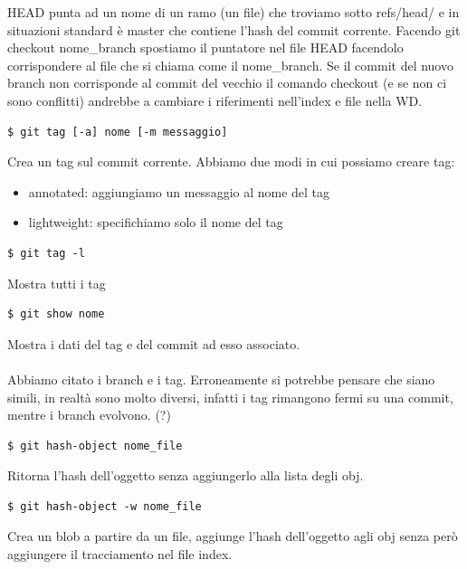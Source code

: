 \noindent HEAD punta ad un nome di un ramo (un file) che troviamo sotto refs/head/ e in situazioni standard è master che contiene l'hash del commit corrente. Facendo git checkout nome\_branch spostiamo il puntatore nel file HEAD facendolo corrispondere al file che si chiama come il nome\_branch.
Se il commit del nuovo branch non corrisponde al commit del vecchio il comando checkout (e se non ci sono conflitti) andrebbe a cambiare i riferimenti nell'index e file nella WD.

\begin{verbatim}
$ git tag [-a] nome [-m messaggio]
\end{verbatim}
Crea un tag sul commit corrente. Abbiamo due modi in cui possiamo creare tag:
\begin{itemize}
    \item annotated: aggiungiamo un messaggio al nome del tag 
    \item lightweight: specifichiamo solo il nome del tag
\end{itemize}

\begin{verbatim}
$ git tag -l
\end{verbatim}
Mostra tutti i tag

\begin{verbatim}
$ git show nome
\end{verbatim}
Mostra i dati del tag e del commit ad esso associato.\\\\

\noindent Abbiamo citato i branch e i tag. Erroneamente si potrebbe pensare che siano simili, in realtà sono molto diversi, infatti i tag rimangono fermi su una commit, mentre i branch evolvono. (?)

\begin{verbatim}
$ git hash-object nome_file
\end{verbatim}
Ritorna l'hash dell'oggetto senza aggiungerlo alla lista degli obj.

\begin{verbatim}
$ git hash-object -w nome_file
\end{verbatim}
Crea un blob a partire da un file, aggiunge l'hash dell'oggetto agli obj senza però aggiungere il tracciamento nel file index.


